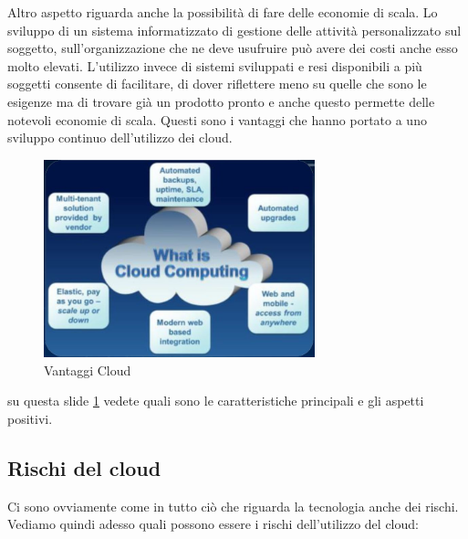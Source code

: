 Altro aspetto riguarda anche la possibilità di fare delle economie di scala. Lo sviluppo di un sistema informatizzato di gestione delle attività personalizzato sul soggetto, sull'organizzazione che ne deve usufruire può avere dei costi anche esso molto elevati. L'utilizzo invece di sistemi sviluppati e resi disponibili a più soggetti consente di facilitare, di dover riflettere meno su quelle che sono le esigenze ma di trovare già un prodotto pronto e anche questo permette delle notevoli economie di scala. Questi sono i vantaggi che hanno portato a uno sviluppo continuo dell'utilizzo dei cloud. 

\begin{figure}[ht!]
    \centering
    \includegraphics[width=0.7\textwidth]{images/17_lez_fig_03}
    \caption{Vantaggi Cloud}
    \label{fig:Vantaggi_Cloud}
\end{figure}

su questa slide \ref{fig:Vantaggi_Cloud} vedete quali sono le caratteristiche principali e gli aspetti positivi.

\subsection{Rischi del cloud}

Ci sono ovviamente come in tutto ciò che riguarda la tecnologia anche dei rischi. 
Vediamo quindi adesso quali possono essere i rischi dell'utilizzo del cloud:


